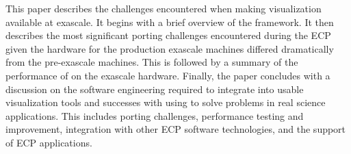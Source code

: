 This paper describes the challenges encountered when making visualization available at exascale.
It begins with a brief overview of the \vtkm framework.
It then describes the most significant porting challenges encountered during the ECP given the hardware for the production exascale machines differed dramatically from the pre-exascale machines.
This is followed by a summary of the performance of \vtkm on the exascale hardware.
Finally, the paper concludes with a discussion on the software engineering required to integrate \vtkm into usable visualization tools and successes with using \vtkm to solve problems in real science applications.
This includes porting challenges, performance testing and improvement, integration with other ECP software technologies, and the support of ECP applications.
